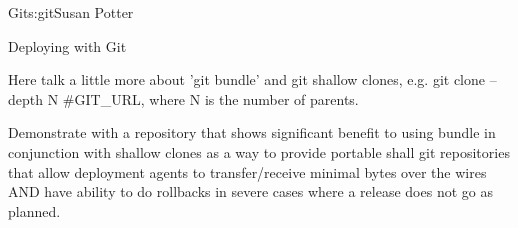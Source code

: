 \begin{aosachapter}{Git}{s:git}{Susan Potter}

\begin{aosasect1}{Deploying with Git}

Here talk a little more about 'git bundle' and git shallow clones, e.g.
git clone --depth N #{GIT\_URL}, where N is the number of parents.

Demonstrate with a repository that shows significant benefit to using
bundle in conjunction with shallow clones as a way to provide portable
shall git repositories that allow deployment agents to transfer/receive
minimal bytes over the wires AND have ability to do rollbacks in severe
cases where a release does not go as planned.

\end{aosasect1}

\end{aosachapter}
